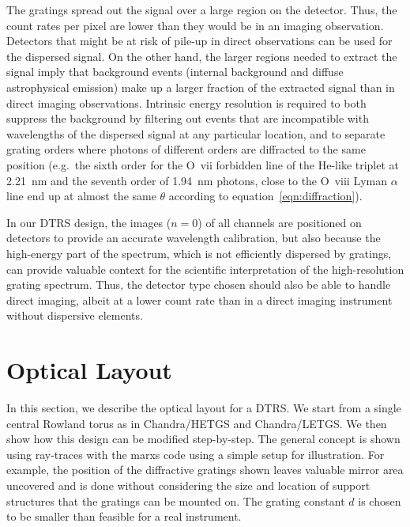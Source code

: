 \documentclass[linenumbers]{aastex631}
\begin{document}
The gratings spread out the signal over a large region on the detector. Thus, the count rates per pixel are lower than they would be in an imaging observation. Detectors that might be at risk of pile-up in direct observations can be used for the dispersed signal. On the other hand, the larger regions needed to extract the signal imply that background events (internal background and diffuse astrophysical emission) make up a larger fraction of the extracted signal than in direct imaging observations.
Intrinsic energy resolution is required to both suppress the background by filtering out events that are incompatible with wavelengths of the dispersed signal at any particular location, and to separate grating orders where photons of different orders are diffracted to the same position (e.g.\ the sixth order for the O~{\sc vii} forbidden line of the He-like triplet at 2.21~nm and the seventh order of 1.94~nm photons, close to the O~{\sc viii} Lyman $\alpha$ line end up at almost the same $\theta$ according to equation~\ref{eqn:diffraction}).

In our DTRS design, the images ($n=0$) of all channels are positioned on detectors to provide an accurate wavelength calibration, but also because the high-energy part of the spectrum, which is not efficiently dispersed by gratings, can provide valuable context for the scientific interpretation of the high-resolution grating spectrum. Thus, the detector type chosen should also be able to handle direct imaging, albeit at a lower count rate than in a direct imaging instrument without dispersive elements.

\section{Optical Layout}
\label{sect:opticallayout}
In this section, we describe the optical layout for a DTRS. We start from a single central Rowland torus as in Chandra/HETGS and Chandra/LETGS. We then show how this design can be modified step-by-step.
The general concept is shown using ray-traces with the marxs code \citep{2017AJ....154..243G} using a simple setup for illustration.
For example, the position of the diffractive gratings shown leaves valuable mirror area uncovered and is done without considering the size and location of support structures that the gratings can be mounted on. The grating constant $d$ is chosen to be smaller than feasible for a real instrument.
\end{document}
